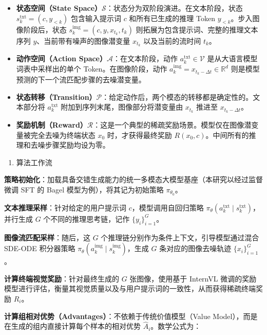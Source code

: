 \begin{itemize}
\tightlist
\item
  \textbf{状态空间（State Space）\(\mathcal{S}\)}：状态分为双阶段演进。在文本阶段，状态 \(s_k^{\mathrm{txt}}=(c,y_{\lt k})\) 包含输入提示词 \(c\) 和所有已生成的推理 Token \(y_{\lt k}\)。步入图像阶段后，状态 \(s_k^{\mathrm{img}}=(c,y,x_{t_k},t_k)\) 则拓展为包含提示词、完整的推理文本序列 \(y\)、当前带有噪声的图像潜变量 \(x_{t_k}\) 以及当前的流时间 \(t_k\)。
\item
  \textbf{动作空间（Action Space）\(\mathcal{A}\)}：在文本阶段，动作 \(a_k^{\mathrm{txt}}\in\mathcal{V}\) 是从大语言模型词表中采样出的单个 Token。在图像阶段，动作 \(a_k^{\mathrm{img}}=x_{t_k-\Delta t}\in\mathbb{R}^d\) 则是模型预测的下一个流匹配步骤的去噪潜变量。
\item
  \textbf{状态转移（Transition）\(\mathcal{P}\)}：给定动作后，两个模态的转移都是确定性的。文本部分将 \(a_k^{\mathrm{txt}}\) 附加到序列末尾，图像部分将潜变量由 \(x_{t_k}\) 推进至 \(x_{t_k-\Delta t}\)。
\item
  \textbf{奖励机制（Reward）\(\mathcal{R}\)}：这是一个典型的稀疏奖励场景。模型仅在图像潜变量被完全去噪为终端状态 \(x_0\) 时，才获得最终奖励 \(R(x_0,c)\)。中间所有的推理和去噪步骤奖励均设为零。
\end{itemize}

\begin{enumerate}
\def\labelenumi{\arabic{enumi}.}
\setcounter{enumi}{1}
\tightlist
\item
  算法工作流
\end{enumerate}

\textbf{策略初始化}：加载具备交错生成能力的统一多模态大模型基座（本研究以经过监督微调 SFT 的 Bagel 模型为例），将其记为初始策略 \(\pi_{\theta_0}\)。

\textbf{文本推理采样}：针对给定的用户提示词 \(c\)，模型调用自回归策略 \(\pi_{\theta}(a_k^{\mathrm{txt}}\mid s_k^{\mathrm{txt}})\)，并行生成 \(G\) 个不同的推理思考链，记作 \(\{y_i\}_{i=1}^{G}\)。

\textbf{图像流匹配采样}：随后，这 \(G\) 个推理链分别作为条件上下文，引导模型通过混合 SDE-ODE 积分器策略 \(\pi_{\theta}(a_k^{\mathrm{img}}\mid s_k^{\mathrm{img}})\)，生成 \(G\) 条对应的图像去噪轨迹 \(\{x_i\}_{i=1}^{G}\)。

\textbf{计算终端视觉奖励}：针对最终生成的 \(G\) 张图像，使用基于 InternVL 微调的奖励模型进行评估，衡量其视觉质量以及与用户提示词的一致性，从而获得稀疏终端奖励 \(R_i\)。

\textbf{计算组相对优势（Advantages）}：不依赖于传统价值模型（Value Model），而是在生成的组内直接计算每个样本的相对优势 \(\hat A_i\)。数学公式为：

